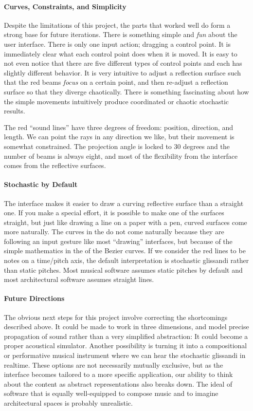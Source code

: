 \paragraph{Curves, Constraints, and Simplicity} Despite the
limitations of this project, the parts that worked well do form a
strong base for future iterations. There is something simple and
\textit{fun} about the user interface. There is only one input action;
dragging a control point. It is immediately clear what each control
point does when it is moved. It is easy to not even notice that there
are five different types of control points and each has slightly
different behavior. It is very intuitive to adjust a reflection
surface such that the red beams \textit{focus} on a certain point, and
then re-adjust a reflection surface so that they diverge
chaotically. There is something fascinating about how the simple
movements intuitively produce coordinated or chaotic stochastic
results.

The red ``sound lines'' have three degrees of freedom: position,
direction, and length. We can point the rays in any direction we like,
but their movement is somewhat constrained.  The projection angle is
locked to 30 degrees and the number of beams is always eight, and
most of the flexibility from the interface comes from the reflective
surfaces.

\paragraph{Stochastic by Default} The  interface makes it easier
to draw a curving reflective surface than a straight one. If you make
a special effort, it is possible to make one of the surfaces straight,
but just like drawing a line on a paper with a pen, curved surfaces
come more naturally. The curves in the  do not come naturally
because they are following an input gesture like most ``drawing''
interfaces, but because of the simple mathematics in the of the Bezier
curves. If we consider the red lines to be notes on a time/pitch axis,
the default interpretation is stochastic glissandi rather than static
pitches. Most musical software assumes static pitches by default and
most architectural software assumes straight lines.

\paragraph{Future Directions}
The obvious next steps for this project involve correcting the
shortcomings described above. It could be made to work in three
dimensions, and model precise propagation of sound rather than a very
simplified abstraction: It could become a proper acoustical
simulator. Another possibility is turning it into a compositional or
performative musical instrument where we can hear the stochastic
glissandi in realtime. These options are not necessarily mutually
exclusive, but as the interface becomes tailored to a more specific
application, our ability to think about the content as abstract
representations also breaks down. The ideal of software that is
equally well-equipped to compose music and to imagine architectural
spaces is probably unrealistic. 

